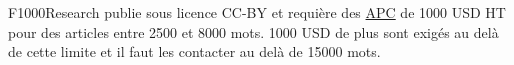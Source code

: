 F1000Research publie sous licence CC-BY et requière des \href{http://f1000research.com/for-authors/article-processing-charges}{APC} de 1000 USD HT pour des articles entre 2500 et 8000 mots.
1000 USD de plus sont exigés au delà de cette limite et il faut les contacter au delà de 15000 mots.
{%
%
%    
%    
%    
%    
%    
%    
%    

}

